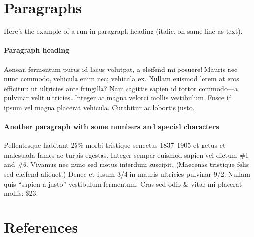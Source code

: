 \section{Paragraphs}

Here's the example of a run-in paragraph heading (italic, on same line as text).

\paragraph{Paragraph heading} Aenean fermentum purus id lacus volutpat, a eleifend mi posuere! Mauris nec nunc commodo, vehicula enim nec; vehicula ex. Nullam euismod lorem at eros efficitur: ut ultricies ante fringilla? Nam sagittis sapien id tortor commodo---a pulvinar velit ultricies\ldots Integer ac magna velorci mollis vestibulum. Fusce id ipsum vel magna placerat vehicula. Curabitur ac lobortis justo. 

\paragraph{Another paragraph with some numbers and special characters} Pellentesque habitant 25\% morbi tristique senectus 1837--1905 et netus et malesuada fames ac turpis egestas. Integer semper euismod sapien vel dictum \#1 and \#6. Vivamus nec nunc sed metus interdum suscipit. (Maecenas tristique felis sed eleifend aliquet.) Donec et ipsum 3/4 in mauris ultricies pulvinar 9/2. Nullam quis ``sapien a justo'' vestibulum fermentum. Cras sed odio \& vitae mi placerat mollis: \$23.

\section{References} 


